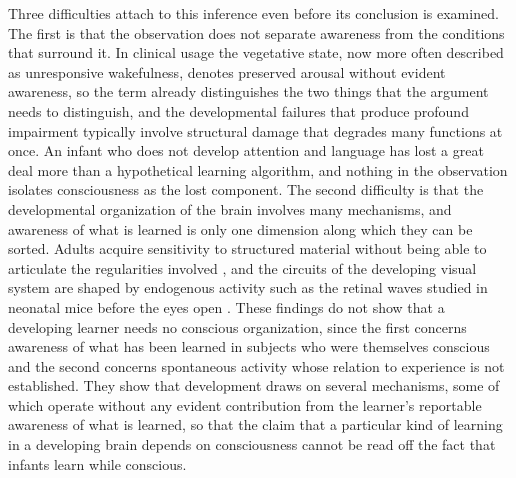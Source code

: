 \documentclass[11pt]{article}
\begin{document}
Three difficulties attach to this inference even before its conclusion is examined. The first is that the observation does not separate awareness from the conditions that surround it. In clinical usage the vegetative state, now more often described as unresponsive wakefulness, denotes preserved arousal without evident awareness, so the term already distinguishes the two things that the argument needs to distinguish, and the developmental failures that produce profound impairment typically involve structural damage that degrades many functions at once. An infant who does not develop attention and language has lost a great deal more than a hypothetical learning algorithm, and nothing in the observation isolates consciousness as the lost component. The second difficulty is that the developmental organization of the brain involves many mechanisms, and awareness of what is learned is only one dimension along which they can be sorted. Adults acquire sensitivity to structured material without being able to articulate the regularities involved \cite{reber1967}, and the circuits of the developing visual system are shaped by endogenous activity such as the retinal waves studied in neonatal mice before the eyes open \cite{ackman2012}. These findings do not show that a developing learner needs no conscious organization, since the first concerns awareness of what has been learned in subjects who were themselves conscious and the second concerns spontaneous activity whose relation to experience is not established. They show that development draws on several mechanisms, some of which operate without any evident contribution from the learner's reportable awareness of what is learned, so that the claim that a particular kind of learning in a developing brain depends on consciousness cannot be read off the fact that infants learn while conscious.
\end{document}

